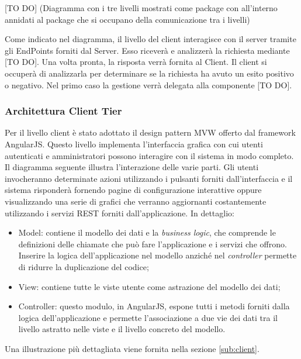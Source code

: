 		[TO DO] (Diagramma con i tre livelli mostrati come package con all'interno annidati al package che si occupano della comunicazione tra i livelli) \newline \newline

		Come indicato nel diagramma, il livello del client interagisce con il server tramite gli EndPoints forniti dal Server. Esso riceverà e analizzerà la richiesta mediante [TO DO]. Una volta pronta, la risposta verrà fornita al Client.\newline
		Il client si occuperà di analizzarla per determinare se la richiesta ha avuto un esito positivo o negativo. Nel primo caso la gestione verrà delegata alla componente [TO DO]. \newline



		\subsubsection{Architettura Client Tier}
		Per il livello client è stato adottato il design pattern MVW offerto dal framework AngularJS. Questo livello implementa l'interfaccia grafica con cui utenti autenticati e amministratori possono interagire con il sistema in modo completo. Il diagramma seguente illustra l'interazione delle varie parti. \newline
		Gli utenti invocheranno determinate azioni utilizzando i pulsanti forniti dall'interfaccia e il sistema risponderà fornendo pagine di configurazione interattive oppure visualizzando una serie di grafici che verranno aggiornanti costantemente utilizzando i servizi REST forniti dall'applicazione. In dettaglio:
		\begin{itemize}
			\item Model: contiene il modello dei dati e la \textit{business logic}, che comprende le definizioni delle chiamate che può fare l'applicazione e i servizi che offrono. Inserire la logica dell'applicazione nel modello anziché nel \textit{controller} permette di ridurre la duplicazione del codice;
			\item View: contiene tutte le viste utente come astrazione del modello dei dati;
			\item Controller: questo modulo, in AngularJS, espone tutti i metodi forniti dalla logica dell'applicazione e permette l'associazione a due vie dei dati tra il livello astratto nelle viste e il livello concreto del modello.
		\end{itemize}
		\noindent
		Una illustrazione più dettagliata viene fornita nella sezione \ref{sub:client}.

